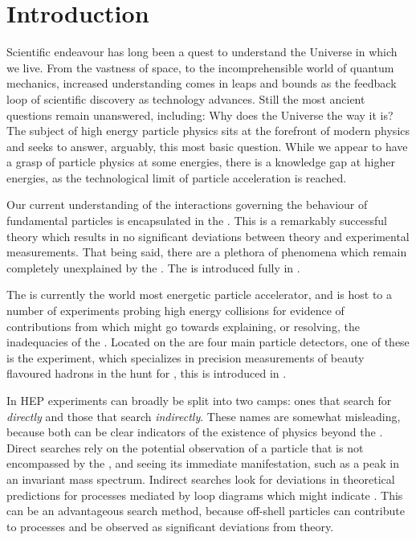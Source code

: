 \chapter{Introduction}
\label{ch:intro}


Scientific endeavour has long been a quest to understand the Universe in which we live.
From the vastness of space, to the incomprehensible world of quantum mechanics,
increased understanding comes in leaps and bounds as the feedback loop of scientific discovery as
technology advances.
Still the most ancient questions remain unanswered, including: Why does the Universe the way it is?
The subject of high energy particle physics sits at the forefront of modern physics and seeks to
answer, arguably, this most basic question.
While we appear to have a grasp of particle physics at some energies, there is a knowledge gap at
higher energies, as the technological limit of particle acceleration is reached.

Our current understanding of the interactions governing the behaviour of fundamental particles is
encapsulated in the \sm.
This is a remarkably successful theory which results in no significant deviations between theory
and experimental measurements.
That being said, there are a plethora of phenomena which remain completely unexplained by the \sm.
The \sm is introduced fully in .

The \lhc is currently the world most energetic particle accelerator, and is host to a number of
experiments probing high energy collisions for evidence of contributions from \np which might go
towards explaining, or resolving, the inadequacies of the \sm.
Located on the \lhc are four main particle detectors, one of these is the \lhcb experiment, which
specializes in precision measurements of beauty
flavoured hadrons in the hunt for \np, this is introduced in .

In \gls{HEP} experiments can broadly be split into two camps: ones that search for \np
\emph{directly} and those that search \emph{indirectly}.
These names are somewhat misleading, because both can be clear indicators of the existence of
physics beyond the \sm.
Direct searches rely on the potential observation of a particle that is not encompassed by the \sm,
and seeing its immediate manifestation, such as a peak in an invariant mass spectrum.
Indirect searches look for deviations in theoretical predictions for processes mediated by loop
diagrams which might indicate \np.
This can be an advantageous search method, because off-shell particles can contribute to processes
and be observed as significant deviations from theory.

